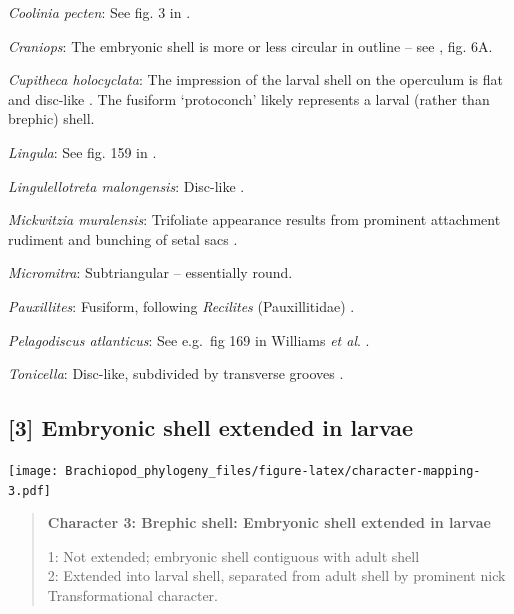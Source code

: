 \documentclass[openany]{book}
\begin{document}
\hypertarget{Coolinia_pecten-coding-2}{}
\emph{Coolinia pecten}: See fig. 3 in
\citet{Bassett2017Earliestontogeny}.

\hypertarget{Craniops-coding-2}{}
\emph{Craniops}: The embryonic shell is more or less circular in outline
-- see \citet{Freeman1999Changesin}, fig. 6A.

\hypertarget{Cupitheca_holocyclata-coding-2}{}
\emph{Cupitheca holocyclata}: The impression of the larval shell on the
operculum is flat and disc-like \citep{Skovsted2016}. The fusiform
`protoconch' \citep{Sun2018} likely represents a larval (rather than
brephic) shell.

\hypertarget{Lingula-coding-2}{}
\emph{Lingula}: See fig. 159 in \citet{Williams1997Introduction}.

\hypertarget{Lingulellotreta_malongensis-coding-2}{}
\emph{Lingulellotreta malongensis}: Disc-like \citep{Li2004}.

\hypertarget{Mickwitzia_muralensis-coding-2}{}
\emph{Mickwitzia muralensis}: Trifoliate appearance results from
prominent attachment rudiment and bunching of setal sacs
\citep{Balthasar2009Thebrachiopod}.

\hypertarget{Micromitra-coding-2}{}
\emph{Micromitra}: Subtriangular -- essentially round.

\hypertarget{Pauxillites-coding-2}{}
\emph{Pauxillites}: Fusiform, following \emph{Recilites} (Pauxillitidae)
\citep{Dzik1978}.

\hypertarget{Pelagodiscus_atlanticus-coding-2}{}
\emph{Pelagodiscus atlanticus}: See e.g.~fig 169 in Williams \emph{et
al}. \citeyearpar{Williams1997Introduction}.

\hypertarget{Tonicella-coding-2}{}
\emph{Tonicella}: Disc-like, subdivided by transverse grooves
\citep{Wanninger2002C}.

\subsection*{{[}3{]} Embryonic shell extended in
larvae}\label{embryonic-shell-extended-in-larvae}

\texttt{[image: Brachiopod\_phylogeny\_files/figure-latex/character-mapping-3.pdf]}

\begin{quote}
\textbf{Character 3: Brephic shell: Embryonic shell extended in larvae}

1: Not extended; embryonic shell contiguous with adult shell\\
2: Extended into larval shell, separated from adult shell by prominent
nick\\
Transformational character.
\end{quote}
\end{document}
